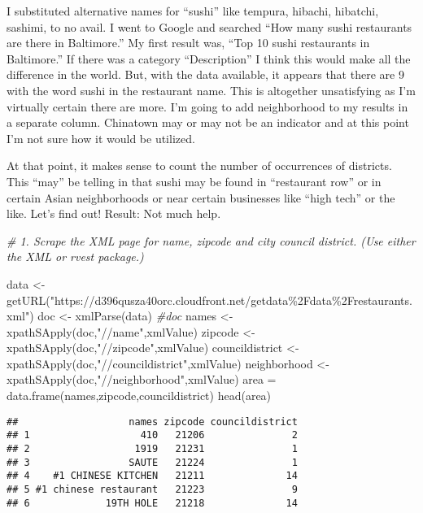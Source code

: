 \documentclass[
]{article}
\newenvironment{Shaded}{\begin{snugshade}}{\end{snugshade}}
\newcommand{\CommentTok}[1]{\textcolor[rgb]{0.56,0.35,0.01}{\textit{#1}}}
\newcommand{\FunctionTok}[1]{\textcolor[rgb]{0.00,0.00,0.00}{#1}}
\newcommand{\NormalTok}[1]{#1}
\newcommand{\OtherTok}[1]{\textcolor[rgb]{0.56,0.35,0.01}{#1}}
\newcommand{\StringTok}[1]{\textcolor[rgb]{0.31,0.60,0.02}{#1}}
\begin{document}
I substituted alternative names for ``sushi'' like tempura, hibachi,
hibatchi, sashimi, to no avail. I went to Google and searched ``How many
sushi restaurants are there in Baltimore.'' My first result was, ``Top
10 sushi restaurants in Baltimore.'' If there was a category
``Description'' I think this would make all the difference in the world.
But, with the data available, it appears that there are 9 with the word
sushi in the restaurant name. This is altogether unsatisfying as I'm
virtually certain there are more. I'm going to add neighborhood to my
results in a separate column. Chinatown may or may not be an indicator
and at this point I'm not sure how it would be utilized.

At that point, it makes sense to count the number of occurrences of
districts. This ``may'' be telling in that sushi may be found in
``restaurant row'' or in certain Asian neighborhoods or near certain
businesses like ``high tech'' or the like. Let's find out! Result: Not
much help.

\begin{Shaded}
\begin{Highlighting}[]
\CommentTok{\#   1. Scrape the XML page for name, zipcode and city council district.  (Use either the XML or rvest package.)}

\NormalTok{data }\OtherTok{\textless{}{-}}\FunctionTok{getURL}\NormalTok{(}\StringTok{"https://d396qusza40orc.cloudfront.net/getdata\%2Fdata\%2Frestaurants.xml"}\NormalTok{)}
\NormalTok{doc }\OtherTok{\textless{}{-}} \FunctionTok{xmlParse}\NormalTok{(data)}
\CommentTok{\#doc}
\NormalTok{names }\OtherTok{\textless{}{-}} \FunctionTok{xpathSApply}\NormalTok{(doc,}\StringTok{"//name"}\NormalTok{,xmlValue)}
\NormalTok{zipcode }\OtherTok{\textless{}{-}} \FunctionTok{xpathSApply}\NormalTok{(doc,}\StringTok{"//zipcode"}\NormalTok{,xmlValue)}
\NormalTok{councildistrict }\OtherTok{\textless{}{-}} \FunctionTok{xpathSApply}\NormalTok{(doc,}\StringTok{"//councildistrict"}\NormalTok{,xmlValue)}
\NormalTok{neighborhood }\OtherTok{\textless{}{-}} \FunctionTok{xpathSApply}\NormalTok{(doc,}\StringTok{"//neighborhood"}\NormalTok{,xmlValue)}
\NormalTok{area }\OtherTok{=} \FunctionTok{data.frame}\NormalTok{(names,zipcode,councildistrict)}
\FunctionTok{head}\NormalTok{(area)}
\end{Highlighting}
\end{Shaded}

\begin{verbatim}
##                   names zipcode councildistrict
## 1                   410   21206               2
## 2                  1919   21231               1
## 3                 SAUTE   21224               1
## 4    #1 CHINESE KITCHEN   21211              14
## 5 #1 chinese restaurant   21223               9
## 6             19TH HOLE   21218              14
\end{verbatim}
\end{document}
